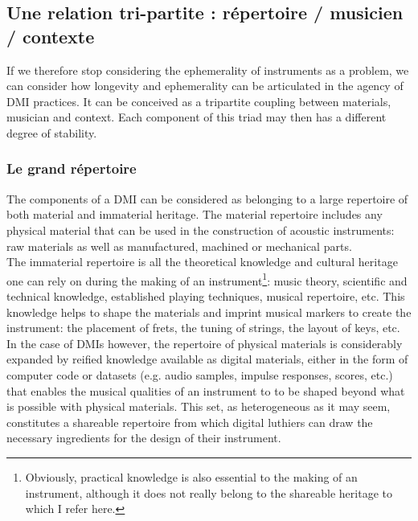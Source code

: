 \subsection{Une relation tri-partite : répertoire / musicien / contexte}
If we therefore stop considering the ephemerality of instruments as a problem, we can consider how longevity and ephemerality can be articulated in the agency of DMI practices. It can be conceived as a tripartite coupling between materials, musician and context. Each component of this triad may then has a different degree of stability.

\subsubsection{Le grand répertoire}
The components of a DMI can be considered as belonging to a large repertoire of both material and immaterial heritage. The material repertoire includes any physical material that can be used in the construction of acoustic instruments: raw materials as well as manufactured, machined or mechanical parts. \\
\indent The immaterial repertoire is all the theoretical knowledge and cultural heritage one can rely on during the making of an instrument\footnote{Obviously, practical knowledge is also essential to the making of an instrument, although it does not really belong to the shareable heritage to which I refer here.}: music theory, scientific and technical knowledge, established playing techniques, musical repertoire, etc. This knowledge helps to shape the materials and imprint musical markers to create the instrument: the placement of frets, the tuning of strings, the layout of keys, etc.\\
\indent In the case of DMIs however, the repertoire of physical materials is considerably expanded by reified knowledge available as digital materials, either in the form of computer code or datasets (e.g. audio samples, impulse responses, scores, etc.) that enables the musical qualities of an instrument to to be shaped beyond what is possible with physical materials.
This set, as heterogeneous as it may seem, constitutes a shareable repertoire from which digital luthiers can draw the necessary ingredients for the design of their instrument.


